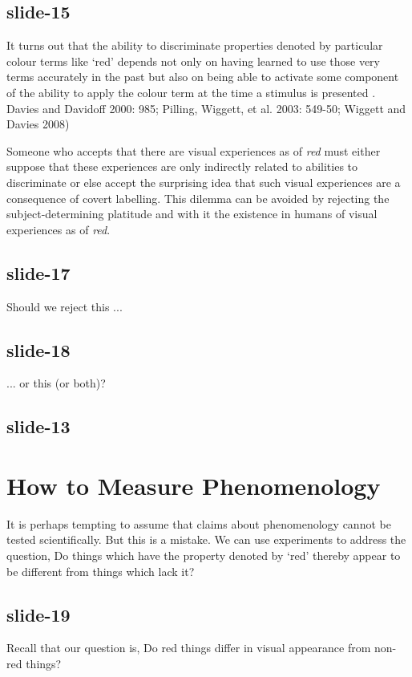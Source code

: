 \documentclass[12pt,\papersize]{extarticle}
\begin{document}
\subsection{slide-15}
It turns out that
the ability to discriminate properties denoted by particular colour terms like
‘red’ depends not only on having learned to use those very terms accurately in
the past \citep{Ozgen:2002yk,Winawer:2007im,zhou:2010_newly} but also on being
able to activate some component of the ability to apply the colour term at the
time a stimulus is presented
\citep{Roberson:2000ge,Pilling:2003bi,Wiggett:2008xt}. %
Davies and Davidoff 2000: 985; Pilling, Wiggett, et al. 2003: 549-50; Wiggett
and Davies 2008)

Someone who accepts that there are visual experiences as of
\emph{red} must either suppose that these experiences are only indirectly
related to abilities to discriminate or else accept the surprising idea that
such visual experiences are a consequence of covert labelling. This dilemma can
be avoided by rejecting the subject-determining platitude and with it the
existence in humans of visual experiences as of \emph{red}.

\subsection{slide-17}
Should we reject this ...

\subsection{slide-18}
... or this (or both)?

\subsection{slide-13}


\section{How to Measure Phenomenology}

It is perhaps tempting to assume that claims about phenomenology
cannot be tested scientifically.
But this is a mistake.  We can use experiments to address the question,
Do things which have the property denoted by ‘red’ thereby appear to be different from things which lack it?

\subsection{slide-19}
Recall that our question is,
Do red things differ in visual appearance from non-red things?
\end{document}
